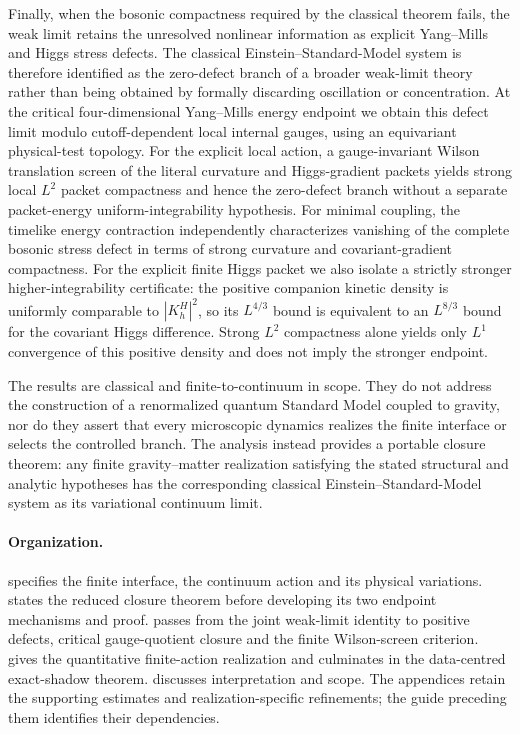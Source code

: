 \documentclass[11pt]{article}
\numberwithin{equation}{section}
\theoremstyle{definition}
\theoremstyle{remark}
\begin{document}
Finally, when the bosonic compactness required by the classical theorem
fails, the weak limit retains the unresolved nonlinear information as
explicit Yang--Mills and Higgs stress defects.  The classical
Einstein--Standard-Model system is therefore identified as the zero-defect
branch of a broader weak-limit theory rather than being obtained by formally
discarding oscillation or concentration.  At the critical four-dimensional
Yang--Mills energy endpoint we obtain this defect limit modulo cutoff-dependent
local internal gauges, using an equivariant physical-test topology.  For the
explicit local action, a gauge-invariant Wilson translation screen of the
literal curvature and Higgs-gradient packets yields strong local $L^2$
packet compactness and hence the zero-defect branch without a separate
packet-energy uniform-integrability hypothesis.  For minimal coupling, the
timelike energy contraction independently characterizes vanishing of the
complete bosonic stress defect in terms of strong curvature and
covariant-gradient compactness.  For the explicit finite Higgs packet we also
isolate a strictly stronger higher-integrability certificate: the positive
companion kinetic density is uniformly comparable to $|K_h^H|^2$, so its
$L^{4/3}$ bound is equivalent to an $L^{8/3}$ bound for the covariant Higgs
difference.  Strong $L^2$ compactness alone yields only $L^1$ convergence of
this positive density and does not imply the stronger endpoint.

The results are classical and finite-to-continuum in scope.  They do not
address the construction of a renormalized quantum Standard Model coupled to
gravity, nor do they assert that every microscopic dynamics realizes the
finite interface or selects the controlled branch.  The analysis instead
provides a portable closure theorem: any finite gravity--matter realization
satisfying the stated structural and analytic hypotheses has the corresponding
classical Einstein--Standard-Model system as its variational continuum limit.

\paragraph{Organization.}

 specifies the finite interface, the continuum action and
its physical variations.  states the reduced closure theorem
before developing its two endpoint mechanisms and proof.
 passes from the joint weak-limit identity to positive
defects, critical gauge-quotient closure and the finite Wilson-screen
criterion.  gives the quantitative finite-action
realization and culminates in the data-centred exact-shadow theorem.
 discusses interpretation and scope.
The appendices retain the supporting estimates and realization-specific
refinements; the guide preceding them identifies their dependencies.
\end{document}
